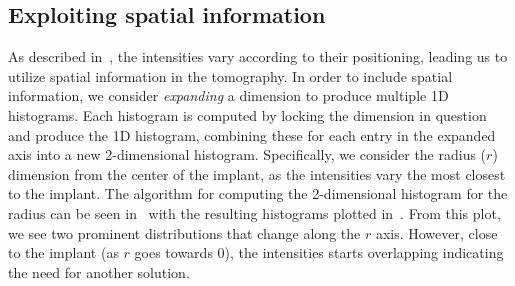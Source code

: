 
\subsection{Exploiting spatial information}
As described in~, the intensities vary according to their positioning, leading us to utilize spatial information in the tomography. 
In order to include spatial information, we consider \textit{expanding} a dimension to produce multiple 1D histograms.
Each histogram is computed by locking the dimension in question and produce the 1D histogram, combining these for each entry in the expanded axis into a new 2-dimensional histogram.
Specifically, we consider the radius ($r$) dimension from the center of the implant, as the intensities vary the most closest to the implant. 
The algorithm for computing the 2-dimensional histogram for the radius can be seen in~ with the resulting histograms plotted in~.
From this plot, we see two prominent distributions that change along the $r$ axis.
However, close to the implant (as $r$ goes towards 0), the intensities starts overlapping indicating the need for another solution.



